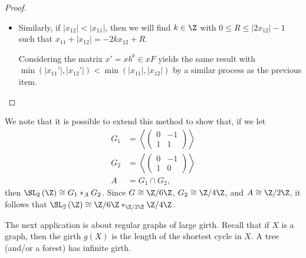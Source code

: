 \documentclass[10pt]{mypackage}
\begin{document}
\begin{proof}
\begin{itemize}
\begin{align*}
                                       &= \left\vert -\left\vert x_{11} \right\vert-2kx_{11} + R + 2kx_{11} \right\vert\\
                                       &\leq \left\vert x_{11} \right\vert\\
                                       &= \left\vert x_{11}' \right\vert.
      \end{align*}
      By parity, we have that $\left\vert x_{12}' \right\vert \neq \left\vert x_{11}' \right\vert$, so that $\left\vert x_{12}' \right\vert < \left\vert x_{11}' \right\vert$, meaning that $\min\left( \left\vert x_{11}' \right\vert,\left\vert x_{12}' \right\vert \right) < \min\left( \left\vert x_{11} \right\vert,\left\vert x_{12} \right\vert \right)$, whence $x'\in F$, meaning $x\in F$.
    \item Similarly, if $\left\vert x_{12} \right\vert < \left\vert x_{11} \right\vert$, then we will find $k\in \Z$ with $0\leq R \leq \left\vert 2x_{12} \right\vert-1$ such that $x_{11} + \left\vert x_{12} \right\vert = -2kx_{12} + R$.

      Considering the matrix $x' = xb^{k}\in xF$ yields the same result with $\min\left( \left\vert x_{11}' \right\vert,\left\vert x_{12}' \right\vert \right) < \min\left( \left\vert x_{11} \right\vert,\left\vert x_{12} \right\vert \right)$ by a similar process as the previous item.
  \end{itemize}
\end{proof}
We note that it is possible to extend this method to show that, if we let
\begin{align*}
  G_1 &= \left\langle \begin{pmatrix}0 & -1 \\ 1 & 1\end{pmatrix} \right\rangle\\
  G_2 &= \left\langle \begin{pmatrix}0 & -1 \\ 1 & 0\end{pmatrix} \right\rangle\\
  A &= G_1\cap G_2,
\end{align*}
then $\SL_2\left( \Z \right)\cong G_1\ast_{A}G_2$. Since $G\cong \Z/6\Z$, $G_2\cong \Z/4\Z$, and $A\cong \Z/2\Z$, it follows that $\SL_2\left( \Z \right)\cong \Z/6\Z\ast_{\Z/2\Z}\Z/4\Z$.

The next application is about regular graphs of large girth. Recall that if $X$ is a graph, then the girth $g(X)$ is the length of the shortest cycle in $X$. A tree (and/or a forest) has infinite girth.
\end{document}

